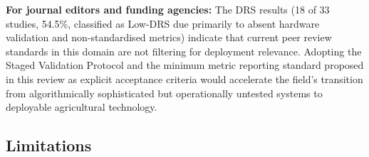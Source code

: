 \documentclass[review,3p,times]{elsarticle}
\begin{document}
\begin{itemize}
{\textbf{For journal editors and funding agencies:} The DRS results (18 of 33 studies, 54.5\%, classified as Low-DRS due primarily to absent hardware validation and non-standardised metrics) indicate that current peer review standards in this domain are not filtering for deployment relevance. Adopting the Staged Validation Protocol and the minimum metric reporting standard proposed in this review as explicit acceptance criteria would accelerate the field's transition from algorithmically sophisticated but operationally untested systems to deployable agricultural technology.

\subsection{Limitations}
\label{sec:limitations}

}
\end{itemize}
\end{document}
